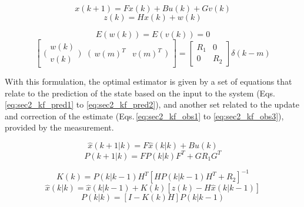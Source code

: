 \begin{equation}
    \label{eq:sec2_kf_pred}
    x(k+1) = F x(k) + B u(k) + G v(k)
\end{equation}
\begin{equation}
    \label{eq:sec2_kf_meas}
    z(k) = H x(k) + w(k)
\end{equation}

\begin{equation}
    \label{eq:sec2_noises}
    E(w(k)) = E(v(k)) = 0
\end{equation}
\begin{equation}
    \label{eq:sec2_noises_cov}
    \begin{bmatrix}
        \bigl(\begin{smallmatrix}
        w(k)\\ 
        v(k)
        \end{smallmatrix}\bigr) &\bigl(\begin{smallmatrix}
        w(m)^T & v(m)^T
        \end{smallmatrix}\bigr) 
        \end{bmatrix}
        =
        \begin{bmatrix}
        R_1 &0 \\ 
         0 & R_2 
        \end{bmatrix}
        \delta(k-m)
\end{equation}

With this formulation, the optimal estimator is given by a set of equations that relate to the prediction of the state based on the input to the system (Eqs.\,\eqref{eq:sec2_kf_pred1} to \eqref{eq:sec2_kf_pred2}), and another set related to the update and correction of the estimate (Eqs.\,\eqref{eq:sec2_kf_obs1} to \eqref{eq:sec2_kf_obs3}), provided by the measurement. 

\begin{equation}
    \label{eq:sec2_kf_pred1}
    \hat{x}(k+1 | k) = F \hat{x}(k | k) + B u(k)
\end{equation}
\begin{equation}
    \label{eq:sec2_kf_pred2}
    P(k+1|k) = F P(k|k) F^T + G R_1 G^T
\end{equation}

\begin{equation}
    \label{eq:sec2_kf_obs1}
     K(k) = P(k|k-1) H^T \left[  H P(k|k-1) H^T + R_2 \right]^{-1}
\end{equation}
\begin{equation}
    \label{eq:sec2_kf_obs2}
    \hat{x}(k | k) = \hat{x}(k | k-1) + K(k) \left [ z(k) - H \hat{x}(k | k-1) \right ]
\end{equation}
\begin{equation}
    \label{eq:sec2_kf_obs3}
    P(k|k) = \left[ I - K(k) H \right] P(k|k-1)
\end{equation}

